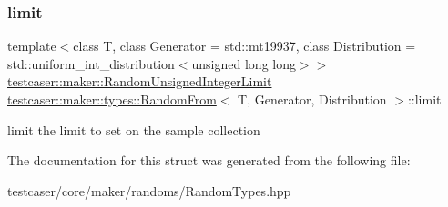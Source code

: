\subsubsection{\texorpdfstring{limit}{limit}}
{\footnotesize\ttfamily template$<$class T, class Generator = std\+::mt19937, class Distribution = std\+::uniform\+\_\+int\+\_\+distribution$<$unsigned long long$>$$>$ \\
\mbox{\hyperlink{structtestcaser_1_1maker_1_1RandomUnsignedIntegerLimit}{testcaser\+::maker\+::\+Random\+Unsigned\+Integer\+Limit}} \mbox{\hyperlink{structtestcaser_1_1maker_1_1types_1_1RandomFrom}{testcaser\+::maker\+::types\+::\+Random\+From}}$<$ T, Generator, Distribution $>$\+::limit}



limit the limit to set on the sample collection 



The documentation for this struct was generated from the following file\+:\begin{DoxyCompactItemize}
\item 
testcaser/core/maker/randoms/Random\+Types.\+hpp\end{DoxyCompactItemize}
